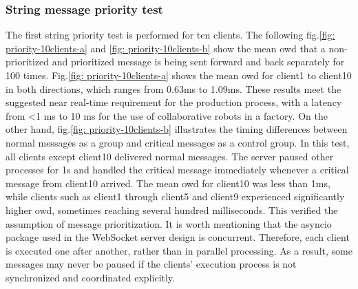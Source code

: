 \subsubsection{String message priority test}
The first string priority test is performed for ten clients. The following 
fig.\ref{fig: priority-10clients-a} and \ref{fig: priority-10clients-b} show the 
mean \gls{owd} that a non-prioritized and prioritized message is being sent forward and 
back separately for 100 times.
Fig.\ref{fig: priority-10clients-a} shows the mean \gls{owd} for client1 to client10 in both 
directions, which ranges from 0.63ms to 1.09ms. These results meet the suggested near real-time 
requirement for the production process\cite{li_5g_2018}, with a latency from <1 ms to 10 ms 
for the use of collaborative robots in a factory. 
On the other hand, fig.\ref{fig: priority-10clients-b} 
illustrates the timing differences between normal messages as a group and critical messages 
as a control group. In this test, all clients except client10 delivered normal messages. 
The server paused other processes for 1s and handled the critical message immediately 
whenever a critical message from client10 arrived. The mean \gls{owd} for client10 was less 
than 1ms, while clients such as client1 through client5 and client9 experienced 
significantly higher \gls{owd}, sometimes reaching several hundred milliseconds. This 
verified the assumption of message prioritization. It is worth mentioning that the 
asyncio package used in the WebSocket server design is concurrent. Therefore, each 
client is executed one after another, rather than in parallel processing. As a result, 
some messages may never be paused if the clients' execution process is not synchronized 
and coordinated explicitly.


